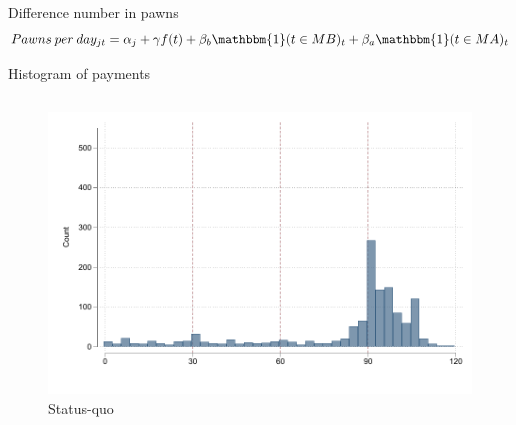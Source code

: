 \documentclass[8pt]{beamer}
\begin{document}
\begin{frame}{Difference number in pawns}
    \[Pawns \: per \: day_{jt} = \alpha_j + \gamma f(t) + \beta_b \mathbbm{1}(t \in MB)_{t} +\beta_a \mathbbm{1}(t \in MA)_{t}\]
    
    \begin{table}[H]
\caption{Number of pawns balance before and after the experiment}
\label{num_pawns_bal}
\begin{center}
\small{}
\end{center}
\end{table}

\hyperlink{consort}{}
\end{frame}



\begin{frame}{Histogram of payments}

\begin{columns}
\begin{column}{.33\textwidth}
    \begin{figure}[H]
    \caption{Status-quo}
    \begin{center}
        \includegraphics[width=\textwidth]{Figuras/hist_payments_sq.pdf}
    \end{center}
\end{figure}
\end{column}


\end{columns}
\end{frame}
\end{document}
